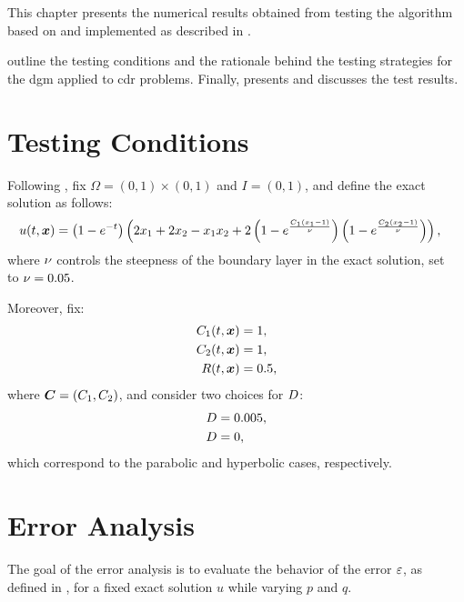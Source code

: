 This chapter presents the numerical results obtained from testing the algorithm based on  and implemented as described in .

 outline the testing conditions and the rationale behind the testing strategies for the \acrshort{dgm} applied to \acrshort{cdr} problems. Finally,  presents and discusses the test results.

\newpage
\section{Testing Conditions} \label{sec:tests}

Following \cite{Feistauer2007}, fix $\Omega = \left( 0, 1 \right) \times \left( 0, 1 \right)$ and $I = \left( 0, 1 \right)$, and define the exact solution as follows:
\begin{align}
    u(t, \bm{x}) &= \left( 1 - e^{-t} \right) \left( 2 x_1 + 2 x_2 - x_1 x_2 + 2 \left( 1 - e^{\frac{C_1 \left( x_1 - 1 \right) }{\nu}} \right) \left( 1 - e^{\frac{C_2 \left( x_2 - 1 \right) }{\nu}} \right) \right), \label{eq:u_test_exact}
\end{align}
where $\nu$ controls the steepness of the boundary layer in the exact solution, set \\ to $\nu = 0.05$.

Moreover, fix:
\begin{align}
    C_1(t, \bm{x}) &= 1, \\
    C_2(t, \bm{x}) &= 1, \\
    R(t, \bm{x}) &= 0.5,
\end{align}
where $\bm{C} = \left( C_1, C_2 \right)$, and consider two choices for $D$:
\begin{align}
    D &= 0.005, \\
    D &= 0,
\end{align}
which correspond to the parabolic and hyperbolic cases, respectively.

\section{Error Analysis} \label{section:error_results}

The goal of the error analysis is to evaluate the behavior of the error $\varepsilon$, as defined in , for a fixed exact solution $u$ while varying $p$ and $q$.

